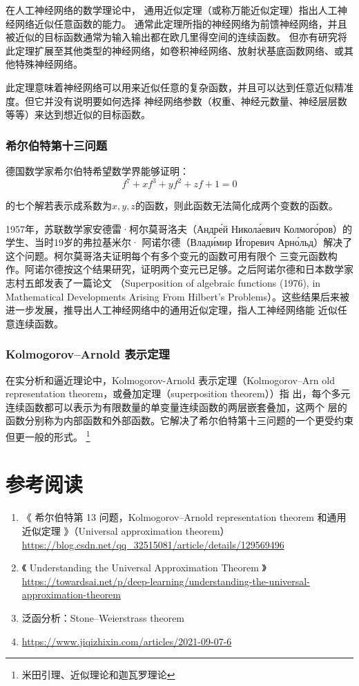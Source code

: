 在人工神经网络的数学理论中， 通用近似定理（或称万能近似定理）指出人工神经网络近似任意函数的能力。 
通常此定理所指的神经网络为前馈神经网络，并且被近似的目标函数通常为输入输出都在欧几里得空间的连续函数。
但亦有研究将此定理扩展至其他类型的神经网络，如卷积神经网络、放射状基底函数网络、或其他特殊神经网络。

此定理意味着神经网络可以用来近似任意的复杂函数，并且可以达到任意近似精准度。但它并没有说明要如何选择
神经网络参数（权重、神经元数量、神经层层数等等）来达到想近似的目标函数。

\subsection*{希尔伯特第十三问题}

德国数学家希尔伯特希望数学界能够证明：
\begin{equation}
    f^7+xf^3+yf^2+zf+1=0
\end{equation}

的七个解若表示成系数为$x,y,z$的函数，则此函数无法简化成两个变数的函数。

1957年，苏联数学家安德雷·柯尔莫哥洛夫（Андре́й Никола́евич Колмого́ров）的学生、当时19岁的弗拉基米尔·
阿诺尔德（Влади́мир И́горевич Арно́льд）解决了这个问题。柯尔莫哥洛夫证明每个有多个变元的函数可用有限个
三变元函数构作。阿诺尔德按这个结果研究，证明两个变元已足够。之后阿诺尔德和日本数学家志村五郎发表了一篇论文
（Superposition of algebraic functions (1976), in Mathematical Developments Arising From
 Hilbert's Problems）。这些结果后来被进一步发展，推导出人工神经网络中的通用近似定理，指人工神经网络能
 近似任意连续函数。

\subsection*{Kolmogorov–Arnold 表示定理}

在实分析和逼近理论中，Kolmogorov-Arnold 表示定理（Kolmogorov–Arn
old representation theorem，或叠加定理（superposition theorem））指
出，每个多元连续函数都可以表示为有限数量的单变量连续函数的两层嵌套叠加，这两个
层的函数分别称为内部函数和外部函数。它解决了希尔伯特第十三问题的一个更受约束但更一般的形式。
\footnote{米田引理、近似理论和迦瓦罗理论}

\chapter{参考阅读}

\begin{enumerate}
    \item 《 希尔伯特第 13 问题，Kolmogorov–Arnold representation theorem 和通用近似定理 》（Universal approximation theorem）\url{https://blog.csdn.net/qq_32515081/article/details/129569496} 
    \item 《 Understanding the Universal Approximation Theorem 》\url{https://towardsai.net/p/deep-learning/understanding-the-universal-approximation-theorem}
    \item 泛函分析：Stone–Weierstrass theorem 
    \item \url{https://www.jiqizhixin.com/articles/2021-09-07-6}
\end{enumerate}
